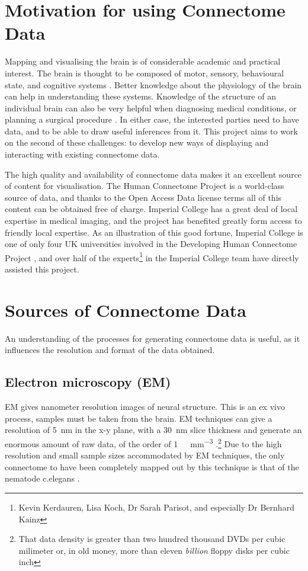 \documentclass[MSc,paper=a4,pagesize=auto]{icldt}
\begin{document}
\section{Motivation for using Connectome Data}
Mapping and visualising the brain is of considerable academic and practical interest. The brain is thought to be composed of motor, sensory, behavioural state, and cognitive systems \cite{Swanson2003}. Better knowledge about the physiology of the brain can help in understanding these systems. Knowledge of the structure of an individual brain can also be very helpful when diagnosing medical conditions, or planning a surgical procedure \cite{Golby2011}. In either case, the interested parties need to have data, and to be able to draw useful inferences from it. This project aims to work on the second of these challenges: to develop new ways of displaying and interacting with existing connectome data. 

The high quality and availability of connectome data makes it an excellent source of content for visualisation. The Human Connectome Project is a world-class source of data, and thanks to the Open Access Data license terms \cite{HCPAccess2014} all of this content can be obtained free of charge. Imperial College has a great deal of local expertise in medical imaging, and the project has benefited greatly form access to friendly local expertise. As an illustration of this good fortune, Imperial College is one of only four UK universities involved in the Developing Human Connectome Project \cite{DHCPPartners2014}, and over half of the experts\footnote{Kevin Kerdauren, Lisa Koch, Dr Sarah Parisot, and especially Dr Bernhard  Kainz} in the Imperial College team have directly assisted this project. 

\section{Sources of Connectome Data}
An understanding of the processes for generating connectome data is useful, as it influences the resolution and format of the data obtained. 

\subsection{Electron microscopy (EM)} 
EM gives nanometer resolution images of neural structure. This is an ex vivo process, samples must be taken from the brain. EM techniques can give a resolution of \SI{5}{\nm} in the x-y plane, with a \SI{30}{\nm} slice thickness and generate an enormous amount of raw data, of the order of \SI{1}{\pebi\byte\per\mm\cubed} \cite{Jeong2010}.\footnote{That data density is greater than two hundred thousand DVDs per cubic milimeter or, in old money, more than eleven \textit{billion} floppy disks per cubic inch} Due to the high resolution and small sample sizes accommodated by EM techniques, the only connectome to have been completely mapped out by this technique is that of the nematode c.elegans \cite{White1986}.
\end{document}

